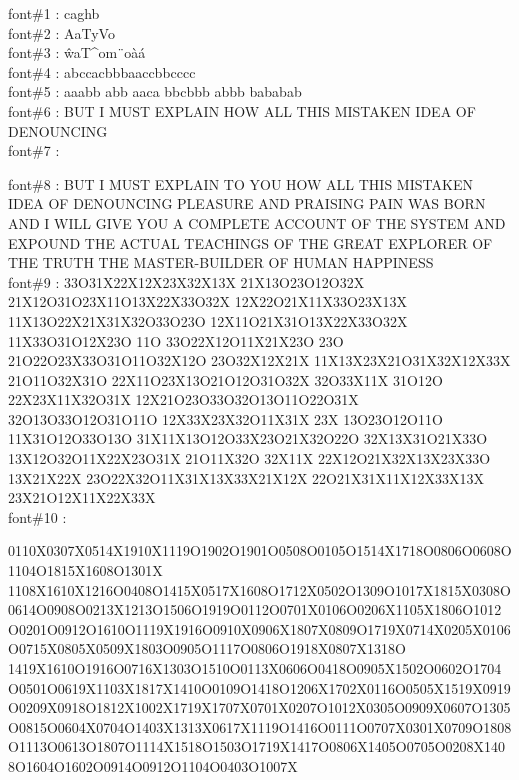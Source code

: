 \documentclass{article}
\begin{document}
\huge font\#1 : {\fonta caghb} \\
\huge font\#2 : {\fontb AaTyVo} \\
\huge font\#3 : {\fontc \^waT\string^om¨o\`a\'a} \\
\huge font\#4 : {\fontd abccacbbbaaccbbcccc} \\
\huge font\#5 : {\fonte aaabb abb aaca bbcbbb abbb bababab} \\
\huge font\#6 : {\fontf BUT I MUST EXPLAIN HOW ALL THIS MISTAKEN IDEA OF DENOUNCING} \\
\huge font\#7 : 


\huge font\#8 : {\fonth BUT I MUST EXPLAIN TO YOU HOW ALL THIS MISTAKEN IDEA OF DENOUNCING PLEASURE AND PRAISING PAIN WAS BORN AND I WILL GIVE YOU A COMPLETE ACCOUNT OF THE SYSTEM AND EXPOUND THE ACTUAL TEACHINGS OF THE GREAT EXPLORER OF THE TRUTH THE MASTER-BUILDER OF HUMAN HAPPINESS} \\
\huge font\#9 : {\fonti 33O31X22X12X23X32X13X 21X13O23O12O32X 21X12O31O23X11O13X22X33O32X 12X22O21X11X33O23X13X 11X13O22X21X31X32O33O23O 12X11O21X31O13X22X33O32X 11X33O31O12X23O 11O 33O22X12O11X21X23O 23O 21O22O23X33O31O11O32X12O 23O32X12X21X 11X13X23X21O31X32X12X33X 21O11O32X31O 
22X11O23X13O21O12O31O32X 32O33X11X 31O12O 22X23X11X32O31X 12X21O23O33O32O13O11O22O31X 32O13O33O12O31O11O 12X33X23X32O11X31X 23X 13O23O12O11O 11X31O12O33O13O 31X11X13O12O33X23O21X32O22O 32X13X31O21X33O 13X12O32O11X22X23O31X 21O11X32O 
32X11X 22X12O21X32X13X23X33O 13X21X22X 23O22X32O11X31X13X33X21X12X 22O21X31X11X12X33X13X 23X21O12X11X22X33X} \\
\huge font\#10 :

{\fontj 0110X0307X0514X1910X1119O1902O1901O0508O0105O1514X1718O0806O0608O1104O1815X1608O1301X 
1108X1610X1216O0408O1415X0517X1608O1712X0502O1309O1017X1815X0308O0614O0908O0213X1213O1506O1919O0112O0701X0106O0206X1105X1806O1012O0201O0912O1610O1119X1916O0910X0906X1807X0809O1719X0714X0205X0106O0715X0805X0509X1803O0905O1117O0806O1918X0807X1318O 
1419X1610O1916O0716X1303O1510O0113X0606O0418O0905X1502O0602O1704O0501O0619X1103X1817X1410O0109O1418O1206X1702X0116O0505X1519X0919O0209X0918O1812X1002X1719X1707X0701X0207O1012X0305O0909X0607O1305O0815O0604X0704O1403X1313X0617X1119O1416O0111O0707X0301X0709O1808O1113O0613O1807O1114X1518O1503O1719X1417O0806X1405O0705O0208X1408O1604O1602O0914O0912O1104O0403O1007X} \\
\end{document}
